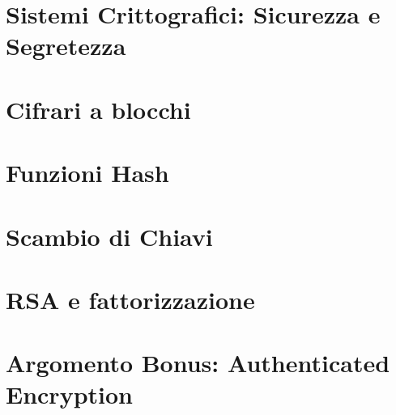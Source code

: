 \documentclass{article}
\theoremstyle{definition}
\theoremstyle{break}
\numberwithin{equation}{section}
\begin{document}
    
    \tableofcontents
    \newpage
    \listofalgorithms
    \newpage

    \section{Sistemi Crittografici: Sicurezza e Segretezza}
    
    
    
    \newpage
    \section{Cifrari a blocchi}
    

    \newpage
    \section{Funzioni Hash}
    
    \newpage
    \section{Scambio di Chiavi}
    
    
    
    \newpage
    \section{RSA e fattorizzazione}
    
    \newpage
    
    \newpage

    \section{Argomento Bonus: Authenticated Encryption}
    
\end{document}
